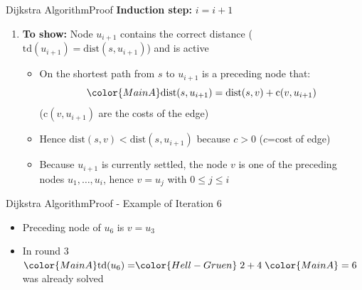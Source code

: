 \begin{frame}{Dijkstra Algorithm}{Proof}
  \textbf{Induction step:} {\color{MainA}$i = i+1$}
  \begin{enumerate}
    \item
      \textbf{To show:} Node {\color{MainA}$u_{i+1}$} contains the correct
      distance ({\color{MainA}$\mathrm{td}(u_{i+1}) = \mathrm{dist}(s, u_{i+1})$})
      and is active
      \begin{itemize}
        \item
          On the shortest path from {\color{MainA}$s$} to
          {\color{MainA}$u_{i+1}$} is a preceding node that:
          \begin{displaymath}
            \color{MainA}\mathrm{dist}(s, u_{i+1})
            = \mathrm{dist}(s, v) + \mathrm{c}(v, u_{i+1})
          \end{displaymath}
          ({\color{MainA}$\mathrm{c}(v, u_{i+1})$} are the costs of the edge)
          \begin{figure}[!h]
            \begin{adjustbox}{width=0.9\linewidth}
              \def\DijkstraTD{0}%
              
            \end{adjustbox}
          \end{figure}
        \item
          Hence
          {\color{MainA}$\mathrm{dist}(s, v) < \mathrm{dist}(s, u_{i+1})$}
          because {\color{MainA}$c > 0$} ($c$=cost of edge)
        \item
          Because {\color{MainA}$u_{i+1}$} is currently settled, the node
          {\color{MainA}$v$} is one of the preceding nodes
          {\color{MainA}$u_1, \dots, u_i$}, hence
          {\color{MainA}$v = u_j$} with
          {\color{MainA}$0 \leq j \leq i$}
      \end{itemize}
  \end{enumerate}
\end{frame}


\begin{frame}{Dijkstra Algorithm}{Proof - Example of Iteration 6}
  \begin{figure}[!h]
    \begin{adjustbox}{width=0.9\linewidth}
      
    \end{adjustbox}
  \end{figure}
  \begin{itemize}
    \item
      Preceding node of {\color{MainA}$u_6$} is
      {\color{MainA}$v = u_3$}
    \item
      In round 3
      \begin{math}
        {\color{MainA}\mathrm{td}(u_6) = }
        {\color{Hell-Gruen}\;2 + 4\;}
        {\color{MainA} = 6}
      \end{math}
      was already solved
  \end{itemize}
\end{frame}

